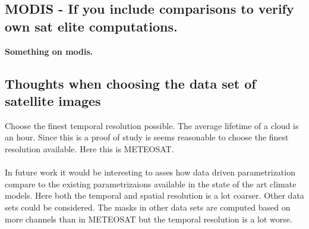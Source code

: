 \subsection{MODIS - If you include comparisons to verify own sat elite computations.} \label{sec:modis}
\textbf{Something on modis.}



\subsection{Thoughts when choosing the data set of satellite images}
Choose the finest temporal resolution possible. The average lifetime of a cloud is an hour. Since this is a proof of study is seems reasonable to choose the finest resolution available. Here this is METEOSAT. 
\\ \\
In future work it would be interesting to asses how data driven parametrization compare to the existing parametrizaions available in the state of the art climate models. Here both the temporal and spatial resolution is a lot coarser. Other data sets could be considered. The masks in other data sets are computed based on more channels than in METEOSAT but the temporal resolution is a lot worse. 

